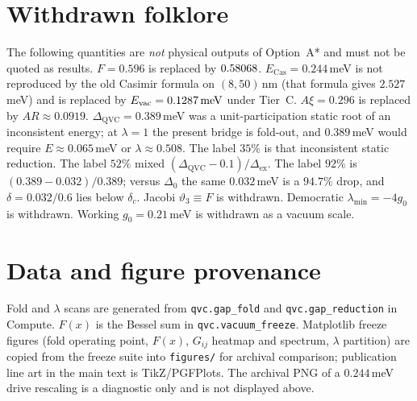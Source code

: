 \documentclass[11pt,letterpaper]{article}
\begin{document}
\section{Withdrawn folklore}
\label{app:folklore}
The following quantities are \emph{not} physical outputs of Option~A* and must not be quoted as results. $F=0.596$ is replaced by $0.58068$. $E_{\mathrm{Cas}}=0.244$\,meV is not reproduced by the old Casimir formula on $(8,50)$\,nm (that formula gives $2.527$\,meV) and is replaced by $E_{\mathrm{vac}}=0.1287\,\mathrm{meV}$ under Tier~C. $A\xi=0.296$ is replaced by $AR\approx 0.0919$. $\Delta_{\mathrm{QVC}}=0.389$\,meV was a unit-participation static root of an inconsistent energy; at $\lambda=1$ the present bridge is fold-out, and $0.389$\,meV would require $E\approx 0.065$\,meV or $\lambda\approx 0.508$. The label $35\%$ is that inconsistent static reduction. The label $52\%$ mixed $(\Delta_{\mathrm{QVC}}-0.1)/\Delta_{\mathrm{ex}}$. The label $92\%$ is $(0.389-0.032)/0.389$; versus $\Delta_0$ the same $0.032$\,meV is a $94.7\%$ drop, and $\delta=0.032/0.6$ lies below $\delta_c$. Jacobi $\vartheta_3\equiv F$ is withdrawn. Democratic $\lambda_{\min}=-4g_0$ is withdrawn. Working $g_0=0.21$\,meV is withdrawn as a vacuum scale.

\section{Data and figure provenance}
\label{app:data}
Fold and $\lambda$ scans are generated from \texttt{qvc.gap\_fold} and \texttt{qvc.gap\_reduction} in \QVC{}Compute. $F(x)$ is the Bessel sum in \texttt{qvc.vacuum\_freeze}. Matplotlib freeze figures (fold operating point, $F(x)$, $G_{ij}$ heatmap and spectrum, $\lambda$ partition) are copied from the freeze suite into \texttt{figures/} for archival comparison; publication line art in the main text is TikZ/PGFPlots. The archival PNG of a $0.244$\,meV drive rescaling is a diagnostic only and is not displayed above.



\end{document}
